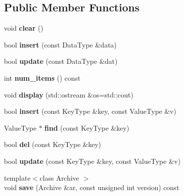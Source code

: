 \subsection*{Public Member Functions}
\begin{CompactItemize}
\item 
\hypertarget{classMap_883205035c7253856278a8a85dc525f6}{
void \textbf{clear} ()}
\label{classMap_883205035c7253856278a8a85dc525f6}

\item 
\hypertarget{classMap_2ab48eceb4ba2747c5c7181394cfcd17}{
bool \textbf{insert} (const DataType \&data)}
\label{classMap_2ab48eceb4ba2747c5c7181394cfcd17}

\item 
\hypertarget{classMap_50367cfe4a5599c0e5d2233489288fb1}{
bool \textbf{update} (const DataType \&dat)}
\label{classMap_50367cfe4a5599c0e5d2233489288fb1}

\item 
\hypertarget{classMap_2aaa91a8937a3d449872a9f25eb3cc66}{
int \textbf{num\_\-items} () const }
\label{classMap_2aaa91a8937a3d449872a9f25eb3cc66}

\item 
\hypertarget{classMap_d422f6b43f48273263015fcf8b4e41ec}{
void \textbf{display} (std::ostream \&os=std::cout)}
\label{classMap_d422f6b43f48273263015fcf8b4e41ec}

\item 
\hypertarget{classMap_8af0b9c6da3a1fcdd954a728e9980569}{
bool \textbf{insert} (const KeyType \&key, const ValueType \&v)}
\label{classMap_8af0b9c6da3a1fcdd954a728e9980569}

\item 
\hypertarget{classMap_0d8d0efc901818fa30995ef397d333b4}{
ValueType $\ast$ \textbf{find} (const KeyType \&key)}
\label{classMap_0d8d0efc901818fa30995ef397d333b4}

\item 
\hypertarget{classMap_d22f21ff232a05b4669cae18c1485610}{
bool \textbf{del} (const KeyType \&key)}
\label{classMap_d22f21ff232a05b4669cae18c1485610}

\item 
\hypertarget{classMap_421c8a2d99d8863548d66531376fa6ef}{
bool \textbf{update} (const KeyType \&key, const ValueType \&v)}
\label{classMap_421c8a2d99d8863548d66531376fa6ef}

\item 
\hypertarget{classMap_e15503abce06dbe595275166d7eede94}{
{\footnotesize template$<$class Archive $>$ }\\void \textbf{save} (Archive \&ar, const unsigned int version) const }
\label{classMap_e15503abce06dbe595275166d7eede94}


\end{CompactItemize}

